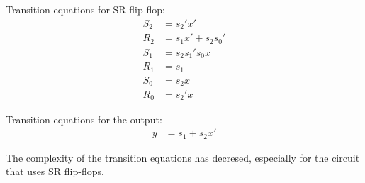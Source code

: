 \documentclass[12pt, a4paper]{article}
\begin{document}
	Transition equations for SR flip-flop:
	\begin{equation}
		\begin{aligned}
			S_2 &= s_2'x' \\
			R_2 &= s_1x' + s_2s_0' \\
			S_1 &= s_2s_1's_0x \\
			R_1 &= s_1 \\
			S_0 &= s_2x \\
			R_0 &= s_2'x
		\end{aligned}
	\end{equation}
	
	Transition equations for the output:
	\begin{equation}
		\begin{aligned}
			y &= s_1 + s_2x'
		\end{aligned}
	\end{equation}
	
	The complexity of the transition equations has decresed, especially for the circuit that uses SR flip-flops.
\end{document}
